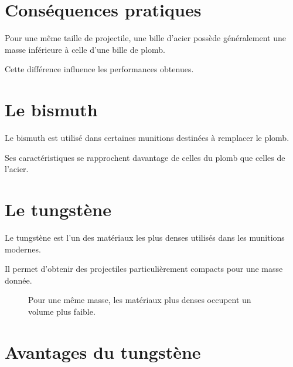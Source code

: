 \section{Conséquences pratiques}

Pour une même taille de projectile, une bille d'acier possède généralement une
masse inférieure à celle d'une bille de plomb.

Cette différence influence les performances obtenues.

\section{Le bismuth}

Le bismuth est utilisé dans certaines munitions destinées à remplacer le
plomb.

Ses caractéristiques se rapprochent davantage de celles du plomb que celles de
l'acier.

\section{Le tungstène}

Le tungstène est l'un des matériaux les plus denses utilisés dans les
munitions modernes.

Il permet d'obtenir des projectiles particulièrement compacts pour une masse
donnée.

\begin{figure}[htbp]
\centering


\caption{Pour une même masse, les matériaux plus denses occupent un volume plus faible.}
\label{fig:masse_constante_materiaux}

\end{figure}

\section{Avantages du tungstène}

